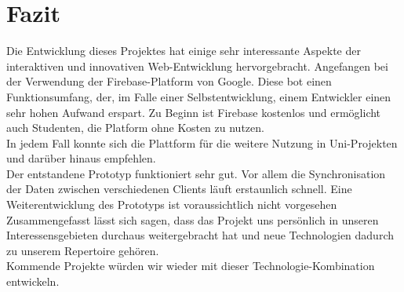 \chapter{Fazit}
Die Entwicklung dieses Projektes hat einige sehr interessante Aspekte der interaktiven und innovativen Web-Entwicklung hervorgebracht. Angefangen bei der Verwendung der Firebase-Platform von Google. Diese bot einen Funktionsumfang, der, im Falle einer Selbstentwicklung, einem Entwickler einen sehr hohen Aufwand erspart. Zu Beginn ist Firebase kostenlos und ermöglicht auch Studenten, die Platform ohne Kosten zu nutzen.\\
In jedem Fall konnte sich die Plattform für die weitere Nutzung in Uni-Projekten und darüber hinaus empfehlen.
\\
Der entstandene Prototyp funktioniert sehr gut. Vor allem die Synchronisation der Daten zwischen verschiedenen Clients läuft erstaunlich schnell. Eine Weiterentwicklung des Prototyps ist voraussichtlich nicht vorgesehen
\\
Zusammengefasst lässt sich sagen, dass das Projekt uns persönlich in unseren Interessensgebieten durchaus weitergebracht hat und neue Technologien dadurch zu unserem Repertoire gehören.\\
Kommende Projekte würden wir wieder mit dieser Technologie-Kombination entwickeln.